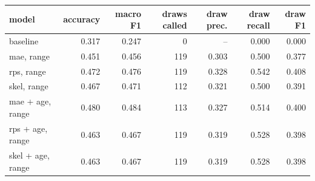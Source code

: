 
\begin{tabular}{lrrrrrr}
\toprule
model & accuracy & macro F1 & draws called & draw prec. & draw recall & draw F1\\
\midrule
baseline & 0.317 & 0.247 & 0 & -- & 0.000 & 0.000\\
mae, range & 0.451 & 0.456 & 119 & 0.303 & 0.500 & 0.377\\
rps, range & 0.472 & 0.476 & 119 & 0.328 & 0.542 & 0.408\\
skel, range & 0.467 & 0.471 & 112 & 0.321 & 0.500 & 0.391\\
mae + age, range & 0.480 & 0.484 & 113 & 0.327 & 0.514 & 0.400\\
rps + age, range & 0.463 & 0.467 & 119 & 0.319 & 0.528 & 0.398\\
skel + age, range & 0.463 & 0.467 & 119 & 0.319 & 0.528 & 0.398\\
\bottomrule
\end{tabular}
